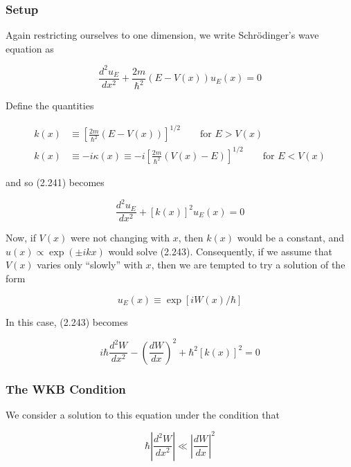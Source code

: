 \documentclass[11pt,a4paper]{article}
\begin{document}
\subsubsection{Setup}

Again restricting ourselves to one dimension, we write Schrödinger's wave equation as

\begin{equation}
\frac{d^2 u_E}{dx^2} + \frac{2m}{\hbar^2}(E - V(x))u_E(x) = 0
\tag{2.241}
\end{equation}

Define the quantities

\begin{align}
k(x) &\equiv \left[\frac{2m}{\hbar^2}(E - V(x))\right]^{1/2} \qquad \text{for } E > V(x) \tag{2.242a} \\
k(x) &\equiv -i\kappa(x) \equiv -i\left[\frac{2m}{\hbar^2}(V(x) - E)\right]^{1/2} \qquad \text{for } E < V(x) \tag{2.242b}
\end{align}

and so (2.241) becomes

\begin{equation}
\frac{d^2 u_E}{dx^2} + [k(x)]^2 u_E(x) = 0
\tag{2.243}
\end{equation}

Now, if $V(x)$ were not changing with $x$, then $k(x)$ would be a constant, and $u(x) \propto \exp(\pm ikx)$ would solve (2.243). Consequently, if we assume that $V(x)$ varies only ``slowly'' with $x$, then we are tempted to try a solution of the form

\begin{equation}
u_E(x) \equiv \exp[iW(x)/\hbar]
\tag{2.244}
\end{equation}

In this case, (2.243) becomes

\begin{equation}
i\hbar\frac{d^2 W}{dx^2} - \left(\frac{dW}{dx}\right)^2 + \hbar^2[k(x)]^2 = 0
\tag{2.245}
\end{equation}

\subsubsection{The WKB Condition}

We consider a solution to this equation under the condition that

\begin{equation}
\boxed{\hbar\left|\frac{d^2 W}{dx^2}\right| \ll \left|\frac{dW}{dx}\right|^2}
\tag{2.246}
\end{equation}
\end{document}
